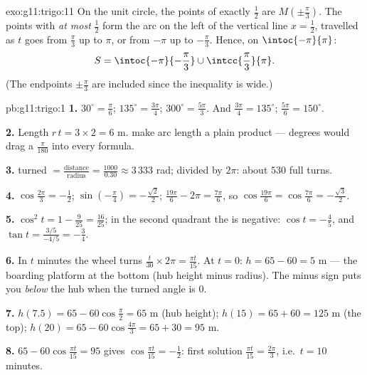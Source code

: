 \begin{solution}{exo:g11:trigo:11}
On the unit circle, the points of  exactly $\frac12$ are
$M\!\left(\pm\frac\pi3\right)$. The points with  \emph{at most}
$\frac12$ form the arc on the left of the vertical line $x = \frac12$,
travelled as $t$ goes from $\frac\pi3$ up to $\pi$, or from $-\pi$ up to
$-\frac\pi3$. Hence, on $\intoc{-\pi}{\pi}$:
\[
S = \intoc{-\pi}{-\frac{\pi}{3}} \cup \intcc{\frac{\pi}{3}}{\pi}.
\]
(The endpoints $\pm\frac\pi3$ are included since the inequality is wide.)
\end{solution}

\begin{solution}{pb:g11:trigo:1}
\textbf{1.} $30^\circ = \frac{\pi}{6}$; $135^\circ =
\frac{3\pi}{4}$; $300^\circ = \frac{5\pi}{3}$. And
$\frac{3\pi}{4} = 135^\circ$; $\frac{5\pi}{6} = 150^\circ$.

\textbf{2.} Length $r\,t = 3 \times 2 = 6$ m.  make arc
length a plain product --- degrees would drag a
$\frac{\pi}{180}$ into every formula.

\textbf{3.}  turned $= \frac{\text{distance}}
{\text{radius}} = \frac{1000}{0.30} \approx 3\,333$ rad;
divided by $2\pi$: about $530$ full turns.

\textbf{4.} $\cos\frac{2\pi}{3} = -\frac12$;
$\sin\left(-\frac\pi4\right) = -\frac{\sqrt2}{2}$;
$\frac{19\pi}{6} - 2\pi = \frac{7\pi}{6}$, so
$\cos\frac{19\pi}{6} = \cos\frac{7\pi}{6} =
-\frac{\sqrt3}{2}$.

\textbf{5.} $\cos^2 t = 1 - \frac{9}{25} = \frac{16}{25}$; in
the second quadrant the  is negative:
$\cos t = -\frac45$, and
$\tan t = \frac{3/5}{-4/5} = -\frac34$.

\textbf{6.} In $t$ minutes the wheel turns
$\frac{t}{30} \times 2\pi = \frac{\pi t}{15}$. At $t = 0$:
$h = 65 - 60 = 5$ m --- the boarding platform at the bottom
(hub height minus radius). The minus sign puts you \emph{below}
the hub when the turned angle is $0$.

\textbf{7.} $h(7.5) = 65 - 60\cos\frac{\pi}{2} = 65$ m (hub
height); $h(15) = 65 + 60 = 125$ m (the top);
$h(20) = 65 - 60\cos\frac{4\pi}{3} = 65 + 30 = 95$ m.

\textbf{8.} $65 - 60\cos\frac{\pi t}{15} = 95$ gives
$\cos\frac{\pi t}{15} = -\frac12$: first solution
$\frac{\pi t}{15} = \frac{2\pi}{3}$, i.e.\ $t = 10$ minutes.


\end{solution}
